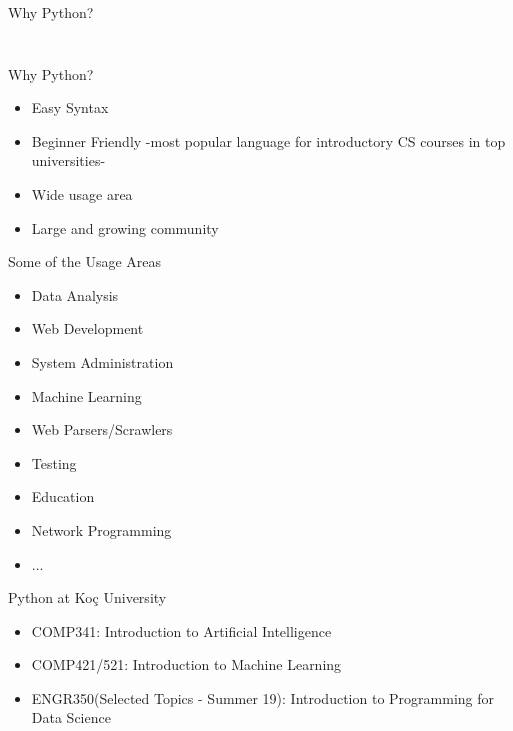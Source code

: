 	\begin{frame}{Why Python?}
		\vspace{-3mm}
		\inputminted[frame=single,framesep=2pt]{python3}{code-examples/io.py}
		\inputminted[frame=single,framesep=2pt]{java}{code-examples/io.java}
	\end{frame}

	\begin{frame}{Why Python?}
		\begin{itemize}
			\LARGE
			\item Easy Syntax
			\item Beginner Friendly
			-most popular language for introductory CS courses in top universities\cite{guo1}- 
			\item Wide usage area
			\item Large and growing community
		\end{itemize}
	\end{frame}

	\begin{frame}{Some of the Usage Areas\cite{survey_jetbrains2018}}
		\begin{itemize}
			\LARGE
			\item Data Analysis
			\item Web Development
			\item System Administration
			\item Machine Learning
			\item Web Parsers/Scrawlers
			\item Testing
			\item Education
			\item Network Programming
			\item ...
		\end{itemize}	
	\end{frame}
	
	\begin{frame}{Python at Koç University}
		\begin{itemize}
			\LARGE
			\item COMP341: Introduction to Artificial Intelligence
			\item COMP421/521: Introduction to Machine Learning
			\item ENGR350(Selected Topics - Summer 19): Introduction to Programming for Data Science  
		\end{itemize}
	\end{frame}

